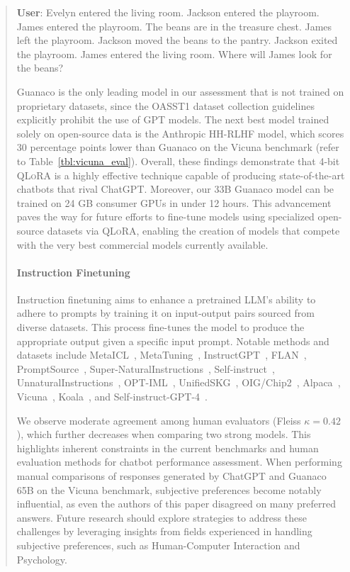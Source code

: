 \begin{quote}
    \textbf{User}: Evelyn entered the living room. Jackson entered the playroom. James entered the playroom. The beans are in the treasure chest. James left the playroom. Jackson moved the beans to the pantry. Jackson exited the playroom. James entered the living room. Where will James look for the beans?

{Guanaco} is the only leading model in our assessment that is not trained on proprietary datasets, since the OASST1 dataset collection guidelines explicitly prohibit the use of GPT models. The next best model trained solely on open-source data is the Anthropic HH-RLHF model, which scores 30 percentage points lower than {Guanaco} on the Vicuna benchmark (refer to Table~\ref{tbl:vicuna_eval}). Overall, these findings demonstrate that 4-bit \textsc{QLoRA} is a highly effective technique capable of producing state-of-the-art chatbots that rival ChatGPT. Moreover, our 33B {Guanaco} model can be trained on 24 GB consumer GPUs in under 12 hours. This advancement paves the way for future efforts to fine-tune models using specialized open-source datasets via \textsc{QLoRA}, enabling the creation of models that compete with the very best commercial models currently available.

\paragraph{Instruction Finetuning} Instruction finetuning aims to enhance a pretrained LLM’s ability to adhere to prompts by training it on input-output pairs sourced from diverse datasets. This process fine-tunes the model to produce the appropriate output given a specific input prompt. Notable methods and datasets include MetaICL~\citep{min2021metaicl}, MetaTuning~\citep{zhong2021adapting}, InstructGPT~\citep{ouyang2022training}, FLAN~\citep{wei2021finetuned,chung2022scaling}, PromptSource~\citep{bach2022promptsource}, Super-NaturalInstructions~\citep{wang2022super,sanh2021multitask}, Self-instruct~\citep{wang2022self}, UnnaturalInstructions~\citep{honovich2022unnatural}, OPT-IML~\citep{iyer2022opt}, UnifiedSKG~\citep{xie2022unifiedskg}, OIG/Chip2~\citep{laion2023}, Alpaca~\citep{alpaca}, Vicuna~\citep{vicuna2023}, Koala~\citep{koala_blogpost_2023}, and Self-instruct-GPT-4~\citep{peng2023instruction}.

We observe moderate agreement among human evaluators (Fleiss $\kappa=0.42$), which further decreases when comparing two strong models. This highlights inherent constraints in the current benchmarks and human evaluation methods for chatbot performance assessment. When performing manual comparisons of responses generated by ChatGPT and {Guanaco} 65B on the Vicuna benchmark, subjective preferences become notably influential, as even the authors of this paper disagreed on many preferred answers. Future research should explore strategies to address these challenges by leveraging insights from fields experienced in handling subjective preferences, such as Human-Computer Interaction and Psychology.


\end{quote}
